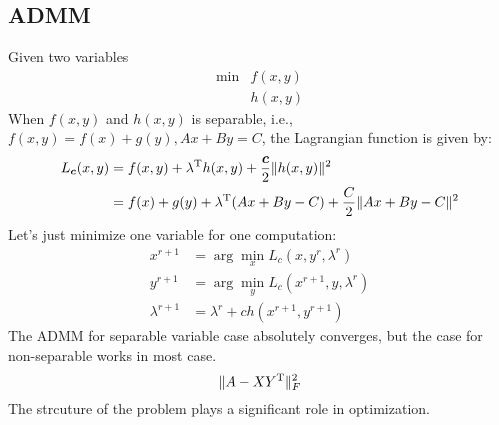 \subsection{ADMM}
Given two variables
\[
\begin{array}{ll}
\min&f(x,y)\\
&h(x,y)
\end{array}
\]
When $f(x,y)$ and $h(x,y)$ is separable, i.e., $f(x,y)=f(x)+g(y), Ax+By=C$, the Lagrangian function is given by:
\begin{align*}
L_{\bm c}(x,y) &= f(x,y)+\lambda^{\mathrm T} h(x,y)+\frac{\bm c}{2}\|h(x,y)\|^2\\
&=f(x)+g(y)+\lambda^{\mathrm T} (Ax+By-C)+\frac{C}{2}\|Ax+By-C\|^2
\end{align*}
Let's just minimize one variable for one computation:
\begin{align*}
x^{r+1}&=\arg\min_xL_c(x,y^r,\lambda^r)\\
y^{r+1}&=\arg\min_yL_c(x^{r+1},y,\lambda^r)\\
\lambda^{r+1}&=\lambda^r+ch(x^{r+1},y^{r+1})
\end{align*}
The ADMM for separable variable case absolutely converges, but the case for non-separable works in most case.
\[
\|A - XY^{\mathrm T}\|_F^2
\]
The strcuture of the problem plays a significant role in optimization.
